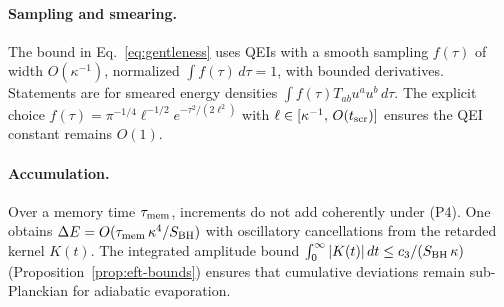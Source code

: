 \documentclass[a4paper,11pt]{article}
\theoremstyle{plain}
\theoremstyle{definition}
\theoremstyle{remark}
\begin{document}
\paragraph{Sampling and smearing.}
The bound in Eq.~\eqref{eq:gentleness} uses QEIs with a smooth sampling $f(\tau)$ of width $O(\kappa^{-1})$,
normalized $\int f(\tau)\,d\tau=1$, with bounded derivatives. Statements are for smeared energy densities
$\int f(\tau) T_{ab}u^a u^b\,d\tau$. The explicit choice $f(\tau)=\pi^{-1/4}\ell^{-1/2}e^{-\tau^2/(2\ell^2)}$ with $\ell\in[\kappa^{-1},\,O(t_{\rm scr})]$ ensures the QEI constant remains $O(1)$.

\paragraph{Accumulation.}
Over a memory time $\tau_{\rm mem}$, increments do not add coherently under (P4). One obtains
$\Delta E=O(\tau_{\rm mem}\,\kappa^4/S_{\rm BH})$ with oscillatory cancellations from the retarded kernel $K(t)$. The integrated amplitude bound $\int_0^\infty|K(t)|\,dt\le c_3/(S_{\rm BH}\,\kappa)$ (Proposition~\ref{prop:eft-bounds}) ensures that cumulative deviations remain sub-Planckian for adiabatic evaporation.
\end{document}

